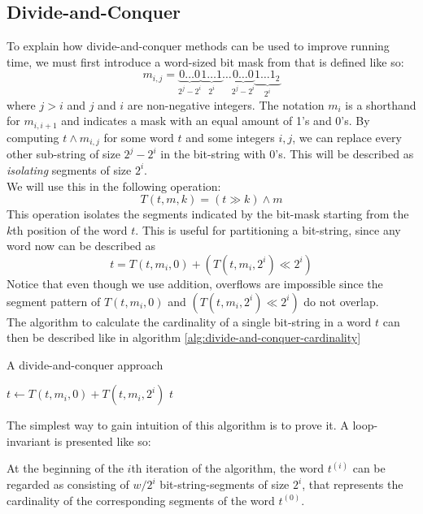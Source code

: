 \subsection{Divide-and-Conquer}
To explain how divide-and-conquer methods can be used to improve running time, we must first introduce a word-sized bit mask from \cite{fast-similarity-search} that is defined like so:
$$m_{i,j} = \underbrace{0\dots 0}_{2^{j}-2^{i}}\underbrace{1\dots 1}_{2^i}\dots\underbrace{0\dots 0}_{2^{j}-2^{i}}\underbrace{1\dots 1_2}_{2^i}$$
where $j > i$ and $j$ and $i$ are non-negative integers. The notation $m_{i}$ is a shorthand for $m_{i, i+1}$ and indicates a mask with an equal amount of 1's and 0's. By computing $t \land m_{i,j}$ for some word $t$ and some integers $i, j$, we can replace every other sub-string of size $2^j-2^i$ in the bit-string with 0's. This will be described as \textit{isolating} segments of size $2^i$.\\
We will use this in the following operation:
\begin{equation}
    T(t, m, k) = (t\gg k) \land m
\end{equation}
This operation isolates the segments indicated by the bit-mask starting from the $k$th position of the word $t$. This is useful for partitioning a bit-string, since any word now can be described as
$$t=T(t, m_i, 0) + (T(t, m_i, 2^i) \ll 2^i)$$
Notice that even though we use addition, overflows are impossible since the segment pattern of $T(t, m_i, 0)$ and $(T(t, m_i, 2^i) \ll 2^i)$ do not overlap.\\
The algorithm to calculate the cardinality of a single bit-string in a word $t$ can then be described like in algorithm \ref{alg:divide-and-conquer-cardinality}
\begin{algorithm}[H]
\caption{A divide-and-conquer approach}\label{alg:divide-and-conquer-cardinality}
\begin{algorithmic}[1]
\State $t \gets T(t, m_i, 0) + T(t, m_i, 2^i)$
\EndFor
\State \Return $t$
\EndFunction
\end{algorithmic}
\end{algorithm}
The simplest way to gain intuition of this algorithm is to prove it. A loop-invariant is presented like so:
\begin{invariant}
\label{thm:divide-invariant}
At the beginning of the $i$th iteration of the algorithm, the word $t^{(i)}$ can be regarded as consisting of $w/2^i$ bit-string-segments of size $2^i$, that represents the cardinality of the corresponding segments of the word $t^{(0)}$.
\end{invariant}
